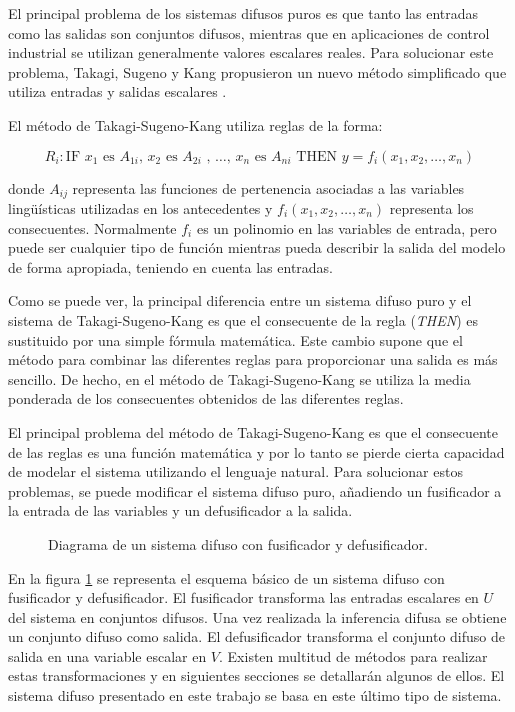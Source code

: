 El principal problema de los sistemas difusos puros es que tanto las entradas como las salidas son conjuntos difusos, mientras que en aplicaciones de control industrial se utilizan generalmente valores escalares reales. Para solucionar este problema, Takagi, Sugeno y Kang propusieron un nuevo método simplificado que utiliza entradas y salidas escalares \cite{takagisugeno1985}\cite{sugenokang1988}.

El método de Takagi-Sugeno-Kang utiliza reglas de la forma:

\begin{equation}
R_{i}: \text{IF }x_{1}\text{ es }A_{1i}\text{, }x_{2}\text{ es }A_{2i}\text{ , \ldots , }x_{n}\text{ es }A_{ni}\text{ THEN } y = f_{i}(x_{1},x_{2},\ldots,x_{n})
\end{equation}

donde $A_{ij}$ representa las funciones de pertenencia asociadas a las variables lingüísticas utilizadas en los antecedentes y $f_{i}(x_{1},x_{2},\ldots,x_{n})$ representa los consecuentes. Normalmente $f_{i}$ es un polinomio en las variables de entrada, pero puede ser cualquier tipo de función mientras pueda describir la salida del modelo de forma apropiada, teniendo en cuenta las entradas. 

Como se puede ver, la principal diferencia entre un sistema difuso puro y el sistema de Takagi-Sugeno-Kang es que el consecuente de la regla (\emph{THEN}) es sustituido por una simple fórmula matemática. Este cambio supone que el método para combinar las diferentes reglas para proporcionar una salida es más sencillo. De hecho, en el método de Takagi-Sugeno-Kang se utiliza la media ponderada de los consecuentes obtenidos de las diferentes reglas.

El principal problema del método de Takagi-Sugeno-Kang es que el consecuente de las reglas es una función matemática y por lo tanto se pierde cierta capacidad de modelar el sistema utilizando el lenguaje natural. Para solucionar estos problemas, se puede modificar el sistema difuso puro, añadiendo un fusificador a la entrada de las variables y un defusificador a la salida.

\begin{figure}[tb]
	\centering
	
	\caption{Diagrama de un sistema difuso con fusificador y defusificador.}
	\label{fig:fuzzy-system}
\end{figure}

En la figura \ref{fig:fuzzy-system} se representa el esquema básico de un sistema difuso con fusificador y defusificador. El fusificador transforma las entradas escalares en $U$ del sistema en conjuntos difusos. Una vez realizada la inferencia difusa se obtiene un conjunto difuso como salida. El defusificador transforma el conjunto difuso de salida en una variable escalar en $V$. Existen multitud de métodos para realizar estas transformaciones y en siguientes secciones se detallarán algunos de ellos. El sistema difuso presentado en este trabajo se basa en este último tipo de sistema.

